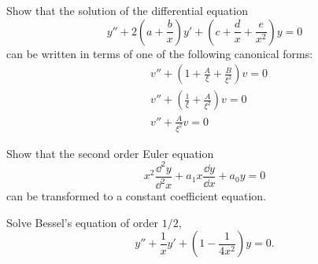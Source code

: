 {\begin{Exercise}
\end{Exercise}





\begin{Exercise}
  \label{exercise canonical y2abxycdxex2y=0}
  Show that the solution of the differential equation
  \[
  y'' + 2\left( a + \frac{b}{x} \right) y' + \left( c + \frac{d}{x}
    + \frac{e}{x^2} \right) y = 0
  \]
  can be written in terms of one of the following canonical forms:
  \begin{align*}
    &v'' + \left( 1 + \frac{A}{\xi} + \frac{B}{\xi^2} \right) v = 0 \\
    &v'' + \left( \frac{1}{\xi} + \frac{A}{\xi^2} \right) v = 0 \\
    &v'' + \frac{A}{\xi^2} v = 0 
  \end{align*}

\end{Exercise}






\begin{Exercise} 
  \label{exercise x2yaxyay=0}
  Show that the second order Euler equation
  \[ 
  x^2 \frac{\dd^2 y}{\dd^2 x} + a_1 x \frac{\dd y}{\dd x} + a_0 y = 0 
  \]
  can be transformed to a constant coefficient equation.

\end{Exercise}






\begin{Exercise}
  \label{exercise y1xy114x2y=0}
  Solve Bessel's equation of order $1/2$,
  \[
  y'' + \frac{1}{x} y' + \left( 1 - \frac{1}{4x^2} \right) y = 0.
  \]

\end{Exercise}






\raggedbottom
}

